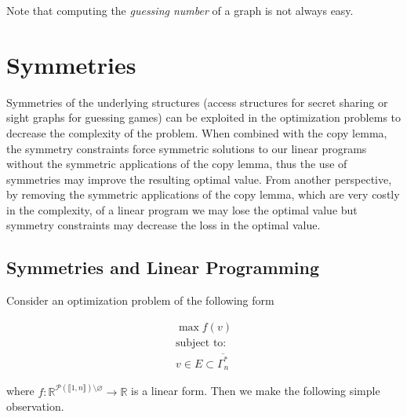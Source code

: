 \documentclass[11pt, a4paper]{kybernetika}
\begin{document}
	Note that computing the \emph{guessing number} of a graph is not always easy.
	
	\section{Symmetries}\label{symmetry-section}
	
	Symmetries of the underlying structures (access structures for secret sharing or sight graphs for guessing games) can be exploited in the optimization problems to decrease the complexity of the problem. When combined with the copy lemma, the symmetry constraints force symmetric solutions to our linear programs without the symmetric applications of the copy lemma, thus the use of symmetries may improve the resulting optimal value. From another perspective, by removing the symmetric applications of the copy lemma, which are very costly in the complexity, of a linear program we may lose the optimal value but symmetry constraints may decrease the loss in the optimal value.
	
	\subsection{Symmetries and Linear Programming}
	
	Consider an optimization problem of the following form
	
	\begin{equation}\label{lp-sym}
		\begin{array}{c}
			\max f(v)\\
			\text{subject to:}\\
			v\in E\subset\overline{\Gamma_n^*}
		\end{array}
	\end{equation}
	
	where $f:\mathbb{R}^{\mathcal{P}(\llbracket1,n\rrbracket)\setminus\varnothing}\to\mathbb{R}$ is a linear form. Then we make the following simple observation.
	
\end{document}
